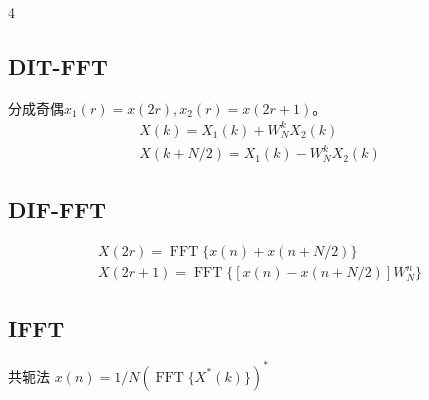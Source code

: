 \documentclass[8pt, a4paper]{extarticle}
\DeclareMathOperator{\FFT}{FFT}
\begin{document}
\begin{multicols}{4}
\subsection{DIT-FFT}
分成奇偶\(x_1(r)=x(2r),x_2(r)=x(2r+1)\)。
\begin{gather*}
X(k)=X_1(k)+W_N^k X_2(k)\\
X(k+N/2)=X_1(k)-W_N^k X_2(k)
\end{gather*}
\subsection{DIF-FFT}
\begin{gather*}
X(2r)=\FFT\{x(n)+x(n+N/2)\}\\
X(2r+1)=\FFT\{[x(n)-x(n+N/2)]W_N^n\}
\end{gather*}
\subsection{IFFT}
共轭法
\(
x(n)=1/N{(\FFT\{X^*(k)\})}^*
\)

\end{multicols}
\end{document}
